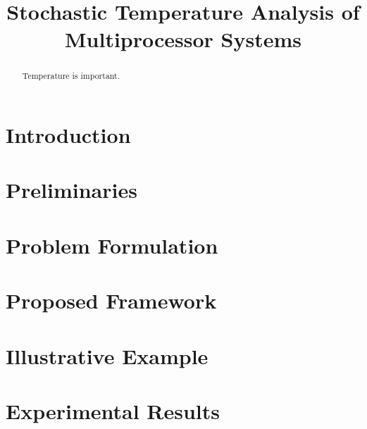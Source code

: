 \documentclass[conference]{IEEEtran}
\begin{document}
  \title{Stochastic Temperature Analysis of\\Multiprocessor Systems}

  \author{
    \and
    \and
  }

  \maketitle

  \begin{abstract}
    Temperature is important.
  \end{abstract}

  \section{Introduction} 
  

  \section{Preliminaries}
  

  \section{Problem Formulation} 
  

  \section{Proposed Framework}
  

  \section{Illustrative Example} 
  

  \section{Experimental Results} 
  

  \printbibliography
\end{document}
